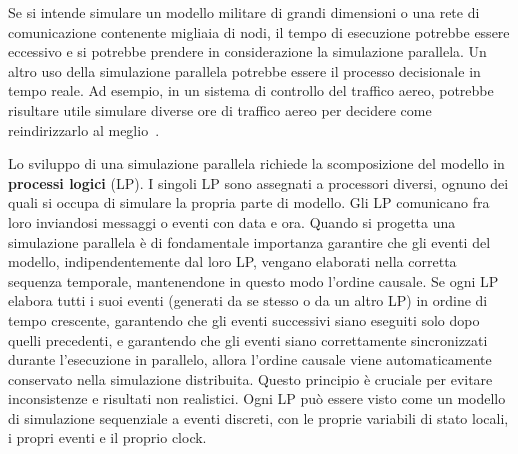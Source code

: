 \documentclass[12pt,a4paper,openright,twoside]{book}
\begin{document}
Se si intende simulare un modello militare di grandi dimensioni o una rete di comunicazione contenente migliaia di nodi, il tempo di esecuzione potrebbe essere eccessivo e si potrebbe prendere in considerazione la simulazione parallela. Un altro uso della simulazione parallela potrebbe essere il processo decisionale in tempo reale. Ad esempio, in un sistema di controllo del traffico aereo, potrebbe risultare utile simulare diverse ore di traffico aereo per decidere come reindirizzarlo al meglio~\cite{DBLP:conf/wsc/Wieland98}. 

Lo sviluppo di una simulazione parallela richiede la scomposizione del modello in \textbf{processi logici} (LP). I singoli LP sono assegnati a processori diversi, ognuno dei quali si occupa di simulare la propria parte di modello. Gli LP comunicano fra loro inviandosi messaggi o eventi con data e ora.
Quando si progetta una simulazione parallela è di fondamentale importanza garantire che gli eventi del modello, indipendentemente dal loro LP, vengano elaborati nella corretta sequenza temporale, mantenendone in questo modo l'ordine causale. Se ogni LP elabora tutti i suoi eventi (generati da se stesso o da un altro LP) in ordine di tempo crescente, garantendo che gli eventi successivi siano eseguiti solo dopo quelli precedenti, e garantendo che gli eventi siano correttamente sincronizzati durante l'esecuzione in parallelo, allora l'ordine causale viene automaticamente conservato nella simulazione distribuita. Questo principio è cruciale per evitare inconsistenze e risultati non realistici.
Ogni LP può essere visto come un modello di simulazione sequenziale a eventi discreti, con le proprie variabili di stato locali, i propri eventi e il proprio clock.
\end{document}
